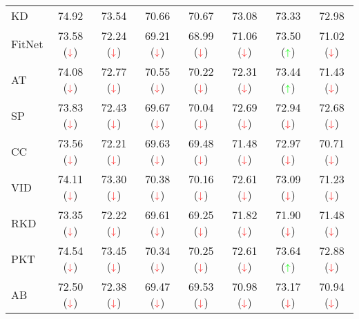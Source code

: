 \documentclass[final]{cvpr}
\theoremstyle{definition}
\newcommand*{\mathcolor}{}
\def\mathcolor#1#{\mathcoloraux{#1}}
\newcommand*{\mathcoloraux}[3]{\protect\leavevmode
  \begingroup
    \color#1{#2}#3\endgroup
}
\begin{document}
\begin{table*}[t!]
\begin{center}
\begin{tabular}{lccccccc}
KD  & 74.92 & 73.54 & 70.66 & 70.67 & 73.08 & 73.33 & 72.98 \\
FitNet  & 73.58 ($\mathcolor{red}{\downarrow}$)& 72.24 ($\mathcolor{red}{\downarrow}$)& 69.21 ($\mathcolor{red}{\downarrow}$)& 68.99 ($\mathcolor{red}{\downarrow}$)& 71.06 ($\mathcolor{red}{\downarrow}$)& 73.50 ($\mathcolor{green}{\uparrow}$)& 71.02 ($\mathcolor{red}{\downarrow}$)\\
AT & 74.08 ($\mathcolor{red}{\downarrow}$)& 72.77 ($\mathcolor{red}{\downarrow}$)& 70.55 ($\mathcolor{red}{\downarrow}$)& 70.22 ($\mathcolor{red}{\downarrow}$)& 72.31 ($\mathcolor{red}{\downarrow}$)& 73.44 ($\mathcolor{green}{\uparrow}$)& 71.43 ($\mathcolor{red}{\downarrow}$)\\
SP & 73.83 ($\mathcolor{red}{\downarrow}$)& 72.43 ($\mathcolor{red}{\downarrow}$)& 69.67 ($\mathcolor{red}{\downarrow}$)& 70.04 ($\mathcolor{red}{\downarrow}$)& 72.69 ($\mathcolor{red}{\downarrow}$)& 72.94 ($\mathcolor{red}{\downarrow}$)& 72.68 ($\mathcolor{red}{\downarrow}$)\\
CC & 73.56 ($\mathcolor{red}{\downarrow}$)& 72.21 ($\mathcolor{red}{\downarrow}$)& 69.63 ($\mathcolor{red}{\downarrow}$)& 69.48 ($\mathcolor{red}{\downarrow}$)& 71.48 ($\mathcolor{red}{\downarrow}$)& 72.97 ($\mathcolor{red}{\downarrow}$)& 70.71 ($\mathcolor{red}{\downarrow}$)\\
VID & 74.11 ($\mathcolor{red}{\downarrow}$)& 73.30 ($\mathcolor{red}{\downarrow}$)& 70.38 ($\mathcolor{red}{\downarrow}$)& 70.16 ($\mathcolor{red}{\downarrow}$)& 72.61 ($\mathcolor{red}{\downarrow}$)& 73.09 ($\mathcolor{red}{\downarrow}$)& 71.23 ($\mathcolor{red}{\downarrow}$)\\
RKD & 73.35 ($\mathcolor{red}{\downarrow}$)& 72.22 ($\mathcolor{red}{\downarrow}$)& 69.61 ($\mathcolor{red}{\downarrow}$)& 69.25 ($\mathcolor{red}{\downarrow}$)& 71.82 ($\mathcolor{red}{\downarrow}$)& 71.90 ($\mathcolor{red}{\downarrow}$)& 71.48 ($\mathcolor{red}{\downarrow}$)\\
PKT & 74.54 ($\mathcolor{red}{\downarrow}$)& 73.45 ($\mathcolor{red}{\downarrow}$)& 70.34 ($\mathcolor{red}{\downarrow}$)& 70.25 ($\mathcolor{red}{\downarrow}$)& 72.61 ($\mathcolor{red}{\downarrow}$)& 73.64 ($\mathcolor{green}{\uparrow}$)& 72.88 ($\mathcolor{red}{\downarrow}$)\\
AB & 72.50 ($\mathcolor{red}{\downarrow}$)& 72.38 ($\mathcolor{red}{\downarrow}$)& 69.47 ($\mathcolor{red}{\downarrow}$)& 69.53 ($\mathcolor{red}{\downarrow}$)& 70.98 ($\mathcolor{red}{\downarrow}$)& 73.17 ($\mathcolor{red}{\downarrow}$)& 70.94 ($\mathcolor{red}{\downarrow}$)\\

\end{tabular}
\end{center}
\end{table*}
\end{document}

